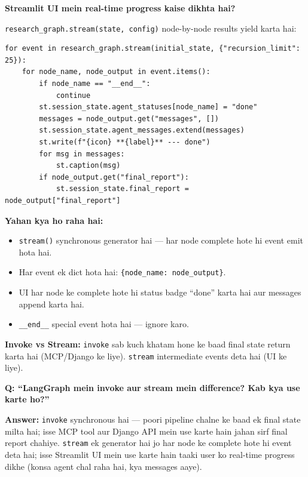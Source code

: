 \documentclass[11pt, a4paper]{article}
\begin{document}
\begin{conceptbox}
\textbf{Streamlit UI mein real-time progress kaise dikhta hai?}

\texttt{research\_graph.stream(state, config)} node-by-node results yield karta hai:\begin{lstlisting}[style=pythonstyle]
for event in research_graph.stream(initial_state, {"recursion_limit": 25}):
    for node_name, node_output in event.items():
        if node_name == "__end__":
            continue
        st.session_state.agent_statuses[node_name] = "done"
        messages = node_output.get("messages", [])
        st.session_state.agent_messages.extend(messages)
        st.write(f"{icon} **{label}** --- done")
        for msg in messages:
            st.caption(msg)
        if node_output.get("final_report"):
            st.session_state.final_report = node_output["final_report"]
\end{lstlisting}

\textbf{Yahan kya ho raha hai:}
\begin{itemize}
\item \texttt{stream()} synchronous generator hai --- har node complete hote hi event emit hota hai.
\item Har event ek dict hota hai: \texttt{\{node\_name: node\_output\}}.
\item UI har node ke complete hote hi status badge ``done'' karta hai aur messages append karta hai.
\item \texttt{\_\_end\_\_} special event hota hai --- ignore karo.
\end{itemize}

\textbf{Invoke vs Stream:} \texttt{invoke} sab kuch khatam hone ke baad final state return karta hai (MCP/Django ke liye). \texttt{stream} intermediate events deta hai (UI ke liye).
\end{conceptbox}

\begin{interviewbox}
\textbf{Q: ``LangGraph mein invoke aur stream mein difference? Kab kya use karte ho?''}

\textbf{Answer:} \texttt{invoke} synchronous hai --- poori pipeline chalne ke baad ek final state milta hai; isse MCP tool aur Django API mein use karte hain jahan sirf final report chahiye. \texttt{stream} ek generator hai jo har node ke complete hote hi event deta hai; isse Streamlit UI mein use karte hain taaki user ko real-time progress dikhe (konsa agent chal raha hai, kya messages aaye).
\end{interviewbox}
\end{document}

